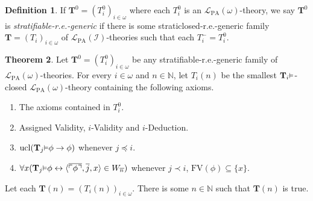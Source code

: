 \documentclass[reqno]{article}
\theoremstyle{definition}
\newtheorem{theorem}{Theorem}
\newtheorem{definition}[theorem]{Definition}
\def\N{\mathbb{N}}
\def\L{\mathscr{L}}
\def\T{\mathbf{T}}
\def\FV{\mathrm{FV}}
\def\LPA{\L_{\mathrm{PA}}}
\def\indset{\mathcal I}
\renewcommand{\Pr}[1]{\T_{#1}\mbox{\small${\vDash}$}}
\newcommand{\ucl}[1]{\mathrm{ucl}(#1)}
\begin{document}
\begin{definition}
If $\T^0=(T^0_i)_{i\in\omega}$ where each $T^0_i$ is an $\LPA(\omega)$-theory,
we say $\T^0$ is \emph{stratifiable-r.e.-generic} if there is
some straticlosed-r.e.-generic family $\T=(T_i)_{i\in\omega}$ of
$\LPA(\indset)$-theories such that
each $T^-_i=T^0_i$.
\end{definition}

\begin{theorem}
\label{generalizedtwoonethree}
Let $\T^0=(T^0_i)_{i\in\omega}$ be any
stratifiable-r.e.-generic
family of $\LPA(\omega)$-theories.
For every $i\in\omega$ and $n\in\N$, let $T_i(n)$ be the smallest
$\Pr i$-closed $\LPA(\omega)$-theory containing the following axioms.
\begin{enumerate}
\item The axioms contained in $T^0_i$.
\item Assigned Validity, $i$-Validity and $i$-Deduction.
\item $\ucl{\Pr j\phi\rightarrow\phi}$ whenever $j\preceq i$.
\item $\forall x(\Pr j\phi\leftrightarrow \langle\overline{\ulcorner\phi\urcorner},\overline j,x\rangle\in W_{\overline n})$
whenever $j\prec i$, $\FV(\phi)\subseteq\{x\}$.
\end{enumerate}
Let each $\T(n)=(T_i(n))_{i\in\omega}$.
There is some $n\in\N$ such that $\T(n)$ is true.
\end{theorem}
\end{document}
